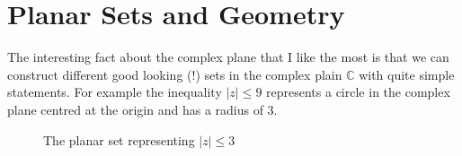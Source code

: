 \section{Planar Sets and Geometry}
The interesting fact about the complex plane that I like the most is that we can construct different good looking (!) sets in the complex plain $\mathbb{C}$ with quite simple statements. For example the inequality $ |z| \leq 9 $ represents a circle in the complex plane centred at the origin and has a radius of 3. \\

\begin{figure}[h!]
	\centering
	\caption{The planar set representing $ |z| \le 3 $}
\end{figure}



